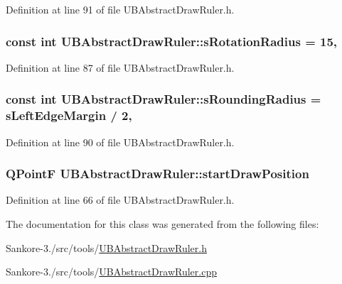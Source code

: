 Definition at line 91 of file U\-B\-Abstract\-Draw\-Ruler.\-h.

\hypertarget{class_u_b_abstract_draw_ruler_ac6fa2ca97290e4240571b0986de855cc}{
\subsubsection[{s\-Rotation\-Radius}]{\setlength{\rightskip}{0pt plus 5cm}const int U\-B\-Abstract\-Draw\-Ruler\-::s\-Rotation\-Radius = 15\hspace{0.3cm}{\ttfamily [static]}, {\ttfamily [protected]}}}\label{d0/de1/class_u_b_abstract_draw_ruler_ac6fa2ca97290e4240571b0986de855cc}


Definition at line 87 of file U\-B\-Abstract\-Draw\-Ruler.\-h.

\hypertarget{class_u_b_abstract_draw_ruler_af6ab3c413950b0276b304a289116728e}{
\subsubsection[{s\-Rounding\-Radius}]{\setlength{\rightskip}{0pt plus 5cm}const int U\-B\-Abstract\-Draw\-Ruler\-::s\-Rounding\-Radius = {\bf s\-Left\-Edge\-Margin} / 2\hspace{0.3cm}{\ttfamily [static]}, {\ttfamily [protected]}}}\label{d0/de1/class_u_b_abstract_draw_ruler_af6ab3c413950b0276b304a289116728e}


Definition at line 90 of file U\-B\-Abstract\-Draw\-Ruler.\-h.

\hypertarget{class_u_b_abstract_draw_ruler_a70a96710815722c56698ba48197bf996}{
\subsubsection[{start\-Draw\-Position}]{\setlength{\rightskip}{0pt plus 5cm}Q\-Point\-F U\-B\-Abstract\-Draw\-Ruler\-::start\-Draw\-Position\hspace{0.3cm}{\ttfamily [protected]}}}\label{d0/de1/class_u_b_abstract_draw_ruler_a70a96710815722c56698ba48197bf996}


Definition at line 66 of file U\-B\-Abstract\-Draw\-Ruler.\-h.



The documentation for this class was generated from the following files\-:\begin{DoxyCompactItemize}
\item 
Sankore-\/3./src/tools/\hyperlink{_u_b_abstract_draw_ruler_8h}{U\-B\-Abstract\-Draw\-Ruler.\-h}\item 
Sankore-\/3./src/tools/\hyperlink{_u_b_abstract_draw_ruler_8cpp}{U\-B\-Abstract\-Draw\-Ruler.\-cpp}\end{DoxyCompactItemize}
